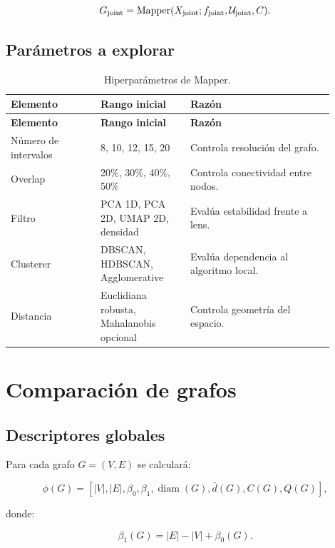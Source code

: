 \documentclass[11pt,letterpaper]{article}
\newcommand{\Mapper}{\operatorname{Mapper}}
\newcommand{\joint}{\rm joint}
\begin{document}
\begin{equation}
G_{\joint}=\Mapper(X_{\joint};f_{\joint},\mathcal{U}_{\joint},C).
\end{equation}

\subsection{Parámetros a explorar}

\begin{longtable}{p{0.25\linewidth}p{0.25\linewidth}p{0.40\linewidth}}
\caption{Hiperparámetros de Mapper.}\\
\toprule
\textbf{Elemento} & \textbf{Rango inicial} & \textbf{Razón} \\
\midrule
\endfirsthead
\toprule
\textbf{Elemento} & \textbf{Rango inicial} & \textbf{Razón} \\
\midrule
\endhead
Número de intervalos & 8, 10, 12, 15, 20 & Controla resolución del grafo. \\
Overlap & 20\%, 30\%, 40\%, 50\% & Controla conectividad entre nodos. \\
Filtro & PCA 1D, PCA 2D, UMAP 2D, densidad & Evalúa estabilidad frente a lens. \\
Clusterer & DBSCAN, HDBSCAN, Agglomerative & Evalúa dependencia al algoritmo local. \\
Distancia & Euclidiana robusta, Mahalanobis opcional & Controla geometría del espacio. \\
\bottomrule
\end{longtable}

\section{Comparación de grafos}

\subsection{Descriptores globales}

Para cada grafo $G=(V,E)$ se calculará:

\begin{equation}
\phi(G)=\left[|V|,|E|,\beta_0,\beta_1,\operatorname{diam}(G),\bar d(G),C(G),Q(G)\right],
\end{equation}

donde:

\begin{equation}
\beta_1(G)=|E|-|V|+\beta_0(G).
\end{equation}
\end{document}
